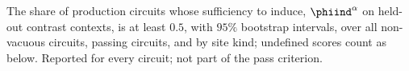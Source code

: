 
\begin{table}[tbp]
\centering
\small
\caption{The share of production circuits whose sufficiency to induce, $\phiind^{\alpha}$ on held-out contrast contexts, is at least $0.5$, with $95\%$ bootstrap intervals, over all non-vacuous circuits, passing circuits, and by site kind; undefined scores count as below. Reported for every circuit; not part of the pass criterion.}
\label{tab:run2026-induce}
\end{table}
